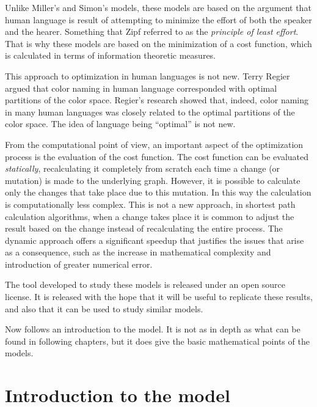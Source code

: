 
Unlike Miller's and Simon's models, these models are based on the argument that human language is result of attempting to minimize the effort of both the speaker and the hearer. \cite{Ferrer2003a} \cite{Zipf1949a} Something that Zipf referred to as the \emph{principle of least effort}. That is why these models are based on the minimization of a cost function, which is calculated in terms of information theoretic measures.

This approach to optimization in human languages is not new.
Terry Regier argued \cite{Regier2007a} that color naming in human language corresponded with optimal partitions of the color space.
Regier's research showed that, indeed, color naming in many human languages was closely related to the optimal partitions of the color space.
The idea of language being ``optimal'' is not new.

From the computational point of view, an important aspect of the optimization process is the evaluation of the cost function.
The cost function can be evaluated \emph{statically}, recalculating it completely from scratch each time a change (or mutation) is made to the underlying graph.
However, it is possible to calculate only the changes that take place due to this mutation.
In this way the calculation is computationally less complex.
This is not a new approach, in shortest path calculation algorithms, when a change takes place it is common to adjust the result based on the change instead of recalculating the entire process. \cite{Buriol2003a}
The dynamic approach offers a significant speedup that justifies the issues that arise as a consequence, such as the increase in mathematical complexity and introduction of greater numerical error.


The tool developed to study these models is released under an open source license.
It is released with the hope that it will be useful to replicate these results, and also that it can be used to study similar models.


Now follows an introduction to the model.
It is not as in depth as what can be found in following chapters, but it does give the basic mathematical points of the models.

\section{Introduction to the model}
\label{sec:introduction_model}

